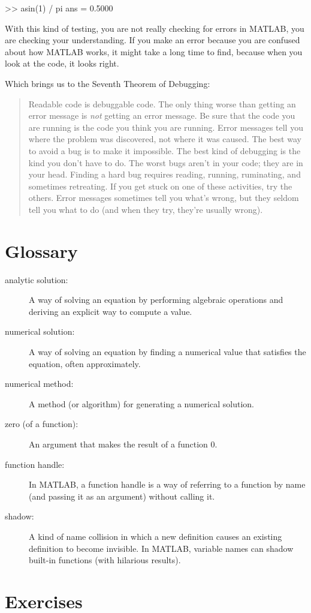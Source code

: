 \documentclass[
]{book}
\numberwithin{Answer}{chapter}
\numberwithin{Exercise}{chapter}
\newcommand{\displaythrm}[1]{%
    \ifthenelse{\equal{#1}{1}}%
        {Readable code is debuggable code.}{%
    \ifthenelse{\equal{#1}{2}}%
        {The only thing worse than getting an error message is {\em
         not} getting an error message.}{%
    \ifthenelse{\equal{#1}{3}}%
        {Be sure that the code you are running
         is the code you think you are running.}{%
    \ifthenelse{\equal{#1}{4}}%
        {Error messages tell you where the problem was discovered,
         not where it was caused.}{%
    \ifthenelse{\equal{#1}{5}}%
        {The best way to avoid a bug is to make it impossible.}{%
    \ifthenelse{\equal{#1}{6}}%
        {The best kind of debugging is the kind you don't have to do.}{%
    \ifthenelse{\equal{#1}{7}}%
        {The worst bugs aren't in your code; they are in your head.}{%
    \ifthenelse{\equal{#1}{8}}%
        {Finding a hard bug requires reading, running, ruminating,
         and sometimes retreating.  If you get stuck on one of these
         activities, try the others.}{%
    \ifthenelse{\equal{#1}{9}}%
        {Error messages sometimes tell you what's wrong, but they
         seldom tell you what to do (and when they try, they're usually
         wrong).}{%
    {}%
}}}}}}}}}}%
\begin{document}
\begin{code}
>> asin(1) / pi
ans = 0.5000
\end{code}

With this kind of testing, you are not really checking for
errors in MATLAB, you are checking your understanding.  If you
make an error because you are confused about how MATLAB works, it
might take a long time to find, because when you look at the code,
it looks right.


Which brings us to the Seventh Theorem of Debugging:

\begin{quote}
\displaythrm{6}
\end{quote}


\section{Glossary}

\begin{description}

\item[analytic solution:] A way of solving an equation by performing
algebraic operations and deriving an explicit way to
compute a value.

\item[numerical solution:] A way of solving an equation by finding
a numerical value that satisfies the equation, often approximately.

\item[numerical method:] A method (or algorithm) for generating
a numerical solution.

\item[zero (of a function):] An argument that makes the result of a function $0$.

\item[function handle:] In MATLAB, a function handle is a way of
referring to a function by name (and passing it as an argument)
without calling it.

\item[shadow:] A kind of name collision in which a new definition
causes an existing definition to become invisible.  In MATLAB,
variable names can shadow built-in functions (with hilarious results).

\end{description}


\section{Exercises}
\end{document}
